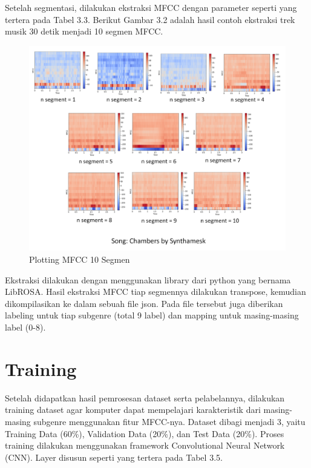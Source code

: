Setelah segmentasi, dilakukan ekstraksi MFCC dengan parameter seperti yang tertera pada Tabel 3.3. Berikut Gambar 3.2 adalah hasil contoh ekstraksi trek musik 30 detik menjadi 10 segmen MFCC.

\begin{figure}[h]
	\centering
	
	\includegraphics[width=\textwidth]{gambar/mfcc segments1}
	
	\caption{Plotting MFCC 10 Segmen}
	\label{fig:mfccsegmen}
\end{figure}

Ekstraksi dilakukan dengan menggunakan library dari python yang bernama LibROSA. Hasil ekstraksi MFCC tiap segmennya dilakukan transpose, kemudian dikompilasikan ke dalam sebuah file json. Pada file tersebut juga diberikan labeling untuk tiap subgenre (total 9 label) dan mapping untuk masing-masing label (0-8).

\section{Training}
\label{sec:training}

Setelah didapatkan hasil pemrosesan dataset serta pelabelannya, dilakukan training dataset agar komputer dapat mempelajari karakteristik dari masing-masing subgenre menggunakan fitur MFCC-nya. Dataset dibagi menjadi 3, yaitu Training Data (60\%), Validation Data (20\%), dan Test Data (20\%). Proses training dilakukan menggunakan framework Convolutional Neural Network (CNN). Layer disusun seperti yang tertera pada Tabel 3.5.

